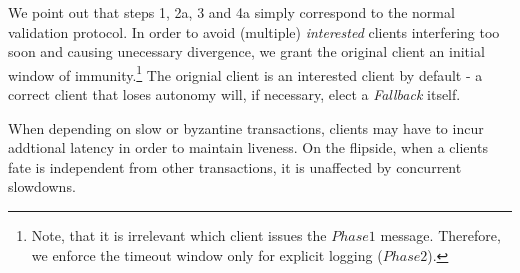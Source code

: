 We point out that steps 1, 2a, 3 and 4a simply correspond to the normal validation protocol. In order to avoid (multiple) \textit{interested} clients interfering too soon and causing unecessary divergence, we grant the original client an initial window of immunity.\footnote{Note, that it is irrelevant which client issues the $Phase1$ message. Therefore, we enforce the timeout window only for explicit logging ($Phase2$).} The orignial client is an interested client by default - a correct client that loses autonomy will, if necessary, elect a \textit{Fallback} itself. 

When depending on slow or byzantine transactions, clients may have to incur addtional latency in order to maintain liveness. On the flipside, when a clients fate is independent from other transactions, it is unaffected by concurrent slowdowns. 
